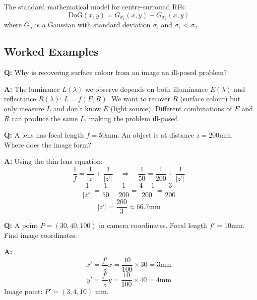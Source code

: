 \separator

\begin{defbox}
The standard mathematical model for centre-surround RFs:
\[
\text{DoG}(x,y) = G_{\sigma_1}(x,y) - G_{\sigma_2}(x,y)
\]
where $G_\sigma$ is a Gaussian with standard deviation $\sigma$, and $\sigma_1 < \sigma_2$.
\end{defbox}

\bigseparator

\subsection{Worked Examples}

\begin{exbox}
\textbf{Q:} Why is recovering surface colour from an image an ill-posed problem?

\textbf{A:} The luminance $L(\lambda)$ we observe depends on both illuminance $E(\lambda)$ and reflectance $R(\lambda)$: $L = f(E, R)$. We want to recover $R$ (surface colour) but only measure $L$ and don't know $E$ (light source). Different combinations of $E$ and $R$ can produce the same $L$, making the problem ill-posed.
\end{exbox}

\begin{exbox}
\textbf{Q:} A lens has focal length $f = 50$mm. An object is at distance $z = 200$mm. Where does the image form?

\textbf{A:} Using the thin lens equation:
\[
\frac{1}{f} = \frac{1}{|z|} + \frac{1}{|z'|} \quad\Rightarrow\quad \frac{1}{50} = \frac{1}{200} + \frac{1}{|z'|}
\]
\[
\frac{1}{|z'|} = \frac{1}{50} - \frac{1}{200} = \frac{4-1}{200} = \frac{3}{200}
\]
\[
|z'| = \frac{200}{3} \approx 66.7\text{mm}
\]
\end{exbox}

\begin{exbox}
\textbf{Q:} A point $P = (30, 40, 100)$ in camera coordinates. Focal length $f' = 10$mm. Find image coordinates.

\textbf{A:}
\[
x' = \frac{f'}{z} x = \frac{10}{100} \times 30 = 3\text{mm}
\]
\[
y' = \frac{f'}{z} y = \frac{10}{100} \times 40 = 4\text{mm}
\]
Image point: $P' = (3, 4, 10)$ mm.
\end{exbox}

